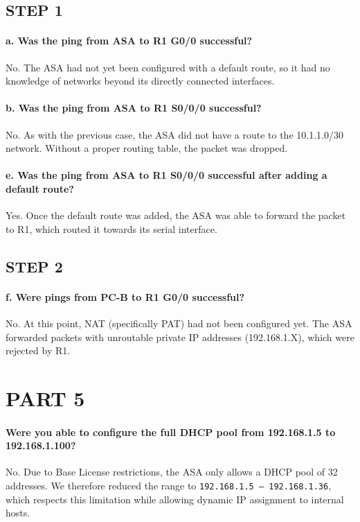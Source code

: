 \documentclass[a4paper,11pt]{article}
\begin{document}
\subsection*{STEP 1}

\paragraph{a. Was the ping from ASA to R1 G0/0 successful?}
No. The ASA had not yet been configured with a default route, so it had no knowledge of networks beyond its directly connected interfaces.

\paragraph{b. Was the ping from ASA to R1 S0/0/0 successful?}
No. As with the previous case, the ASA did not have a route to the 10.1.1.0/30 network. Without a proper routing table, the packet was dropped.

\paragraph{e. Was the ping from ASA to R1 S0/0/0 successful after adding a default route?}
Yes. Once the default route was added, the ASA was able to forward the packet to R1, which routed it towards its serial interface.

\subsection*{STEP 2}

\paragraph{f. Were pings from PC-B to R1 G0/0 successful?}
No. At this point, NAT (specifically PAT) had not been configured yet. The ASA forwarded packets with unroutable private IP addresses (192.168.1.X), which were rejected by R1.

\section*{PART 5}

\paragraph{Were you able to configure the full DHCP pool from 192.168.1.5 to 192.168.1.100?}
No. Due to Base License restrictions, the ASA only allows a DHCP pool of 32 addresses. We therefore reduced the range to \texttt{192.168.1.5 – 192.168.1.36}, which respects this limitation while allowing dynamic IP assignment to internal hosts.
\end{document}
